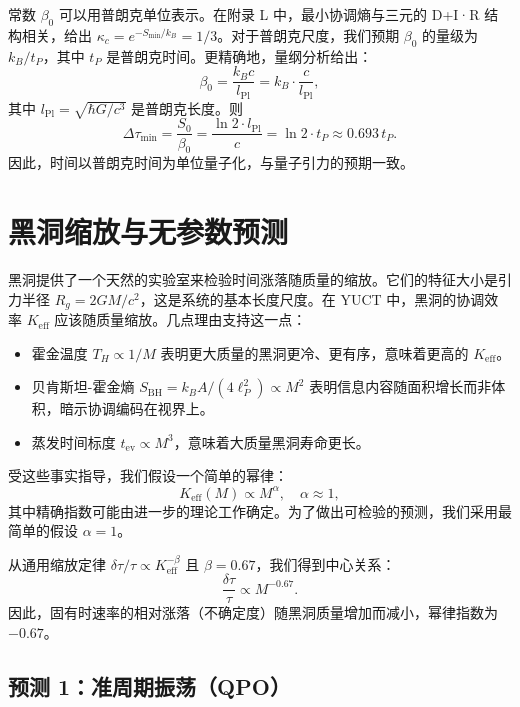 \documentclass[12pt,a4paper]{article}
\newcommand{\Keff}{K_{\mathrm{eff}}}
\newcommand{\kappac}{\kappa_c}
\newcommand{\Lpl}{l_{\mathrm{Pl}}}
\begin{document}
	常数 \(\beta_0\) 可以用普朗克单位表示。在附录 L 中，最小协调熵与三元的 D+I·R 结构相关，给出 \(\kappac = e^{-S_{\min}/k_B} = 1/3\)。对于普朗克尺度，我们预期 \(\beta_0\) 的量级为 \(k_B / t_P\)，其中 \(t_P\) 是普朗克时间。更精确地，量纲分析给出：
	\begin{equation}
		\beta_0 = \frac{k_B c}{\Lpl} = k_B \cdot \frac{c}{\Lpl},
	\end{equation}
	其中 \(\Lpl = \sqrt{\hbar G/c^3}\) 是普朗克长度。则
	\begin{equation}
		\Delta \tau_{\min} = \frac{S_0}{\beta_0} = \frac{\ln 2 \cdot \Lpl}{c} = \ln 2 \cdot t_P \approx 0.693 \, t_P.
	\end{equation}
	因此，时间以普朗克时间为单位量子化，与量子引力的预期一致。
	
	\section{黑洞缩放与无参数预测}
	\label{sec:blackhole}
	
	黑洞提供了一个天然的实验室来检验时间涨落随质量的缩放。它们的特征大小是引力半径 \(R_g = 2GM/c^2\)，这是系统的基本长度尺度。在 YUCT 中，黑洞的协调效率 \(\Keff\) 应该随质量缩放。几点理由支持这一点：
	\begin{itemize}
		\item 霍金温度 \(T_H \propto 1/M\) 表明更大质量的黑洞更冷、更有序，意味着更高的 \(\Keff\)。
		\item 贝肯斯坦-霍金熵 \(S_{\text{BH}} = k_B A/(4\ell_P^2) \propto M^2\) 表明信息内容随面积增长而非体积，暗示协调编码在视界上。
		\item 蒸发时间标度 \(t_{\text{ev}} \propto M^3\)，意味着大质量黑洞寿命更长。
	\end{itemize}
	受这些事实指导，我们假设一个简单的幂律：
	\begin{equation}
		\Keff(M) \propto M^{\alpha}, \quad \alpha \approx 1,
	\end{equation}
	其中精确指数可能由进一步的理论工作确定。为了做出可检验的预测，我们采用最简单的假设 \(\alpha = 1\)。
	
	从通用缩放定律 \(\delta \tau / \tau \propto \Keff^{-\beta}\) 且 \(\beta = 0.67\)，我们得到中心关系：
	\begin{equation}
		\boxed{\frac{\delta \tau}{\tau} \propto M^{-0.67}}.
	\end{equation}
	因此，固有时速率的相对涨落（不确定度）随黑洞质量增加而减小，幂律指数为 \(-0.67\)。
	
	\subsection{预测 1：准周期振荡（QPO）}
	
\end{document}
